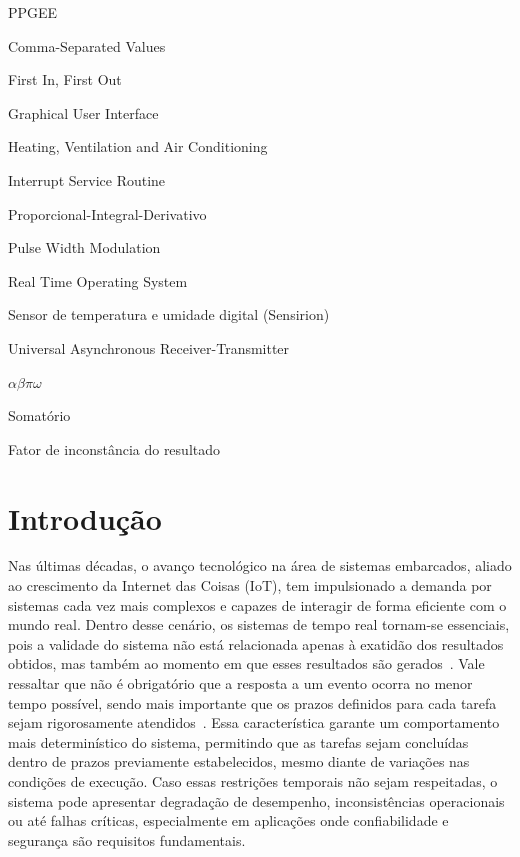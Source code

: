 \documentclass[repeatfields,xlists,xpacks,oneside]{ufrgscca}
\begin{document}
\setcounter{tocdepth}{3}

\listoffigures
\listoftables
\listofcodelist

\begin{listofabbrv}{PPGEE}
    \item[CSV]   Comma-Separated Values
    \item[FIFO]  First In, First Out
    \item[GUI]   Graphical User Interface
    \item[HVAC]  Heating, Ventilation and Air Conditioning
    \item[ISR]   Interrupt Service Routine
    \item[PID]   Proporcional-Integral-Derivativo
    \item[PWM]   Pulse Width Modulation
    \item[RTOS]  Real Time Operating System
    \item[SHT20] Sensor de temperatura e umidade digital (Sensirion)
    \item[UART]  Universal Asynchronous Receiver-Transmitter
\end{listofabbrv}

\begin{listofsymbols}{$\alpha\beta\pi\omega$}
       \item[$\sum$] Somatório
       \item[$\alpha\beta\pi\omega$] Fator de inconstância do resultado
\end{listofsymbols}

\tableofcontents


\chapter{Introdução}

Nas últimas décadas, o avanço tecnológico na área de sistemas embarcados,
aliado ao crescimento da Internet das Coisas (IoT), tem impulsionado a demanda
por sistemas cada vez mais complexos e capazes de interagir de forma eficiente
com o mundo real. Dentro desse cenário, os sistemas de tempo real tornam-se essenciais,
pois a validade do sistema não está relacionada apenas à exatidão dos resultados obtidos,
mas também ao momento em que esses resultados são gerados~\cite{SPOHN:FreeRTOS-Arduino-2019}.
Vale ressaltar que não é obrigatório que a resposta a um evento ocorra no menor tempo possível,
sendo mais importante que os prazos definidos para cada tarefa sejam rigorosamente
atendidos~\cite{denardin2019rtos}. Essa característica garante um comportamento mais
determinístico do sistema, permitindo que as tarefas sejam concluídas dentro de prazos
previamente estabelecidos, mesmo diante de variações nas condições de execução. Caso essas
restrições temporais não sejam respeitadas, o sistema pode apresentar degradação de desempenho,
inconsistências operacionais ou até falhas críticas, especialmente em aplicações onde confiabilidade
e segurança são requisitos fundamentais.
\end{document}
